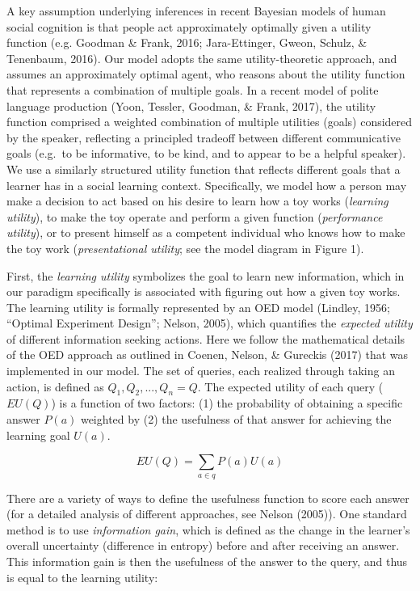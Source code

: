 \documentclass[10pt, letterpaper]{article}
\begin{document}
A key assumption underlying inferences in recent Bayesian models of
human social cognition is that people act approximately optimally given
a utility function (e.g. Goodman \& Frank, 2016; Jara-Ettinger, Gweon,
Schulz, \& Tenenbaum, 2016). Our model adopts the same utility-theoretic
approach, and assumes an approximately optimal agent, who reasons about
the utility function that represents a combination of multiple goals. In
a recent model of polite language production (Yoon, Tessler, Goodman, \&
Frank, 2017), the utility function comprised a weighted combination of
multiple utilities (goals) considered by the speaker, reflecting a
principled tradeoff between different communicative goals (e.g.~to be
informative, to be kind, and to appear to be a helpful speaker). We use
a similarly structured utility function that reflects different goals
that a learner has in a social learning context. Specifically, we model
how a person may make a decision to act based on his desire to learn how
a toy works (\emph{learning utility}), to make the toy operate and
perform a given function (\emph{performance utility}), or to present
himself as a competent individual who knows how to make the toy work
(\emph{presentational utility}; see the model diagram in Figure 1).

First, the \emph{learning utility} symbolizes the goal to learn new
information, which in our paradigm specifically is associated with
figuring out how a given toy works. The learning utility is formally
represented by an OED model (Lindley, 1956; ``Optimal Experiment
Design''; Nelson, 2005), which quantifies the \emph{expected utility} of
different information seeking actions. Here we follow the mathematical
details of the OED approach as outlined in Coenen, Nelson, \& Gureckis
(2017) that was implemented in our model. The set of queries, each
realized through taking an action, is defined as
\(Q_1, Q_2, ..., Q_n = {Q}\). The expected utility of each query
(\(EU(Q)\)) is a function of two factors: (1) the probability of
obtaining a specific answer \(P(a)\) weighted by (2) the usefulness of
that answer for achieving the learning goal \(U(a)\).

\[EU(Q) = \sum_{a\in q}{P(a)U(a)}\]

There are a variety of ways to define the usefulness function to score
each answer (for a detailed analysis of different approaches, see Nelson
(2005)). One standard method is to use \emph{information gain}, which is
defined as the change in the learner's overall uncertainty (difference
in entropy) before and after receiving an answer. This information gain
is then the usefulness of the answer to the query, and thus is equal to
the learning utility:
\end{document}
